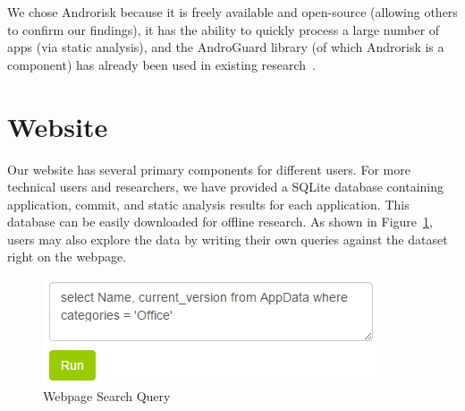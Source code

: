 \documentclass[journal,transmag]{IEEEtran}
\newcommand{\todo}[1]{\textcolor{cyan}{\textbf{[#1]}}}
\newcommand{\dan}[1]{\textcolor{blue}{{\it [Dan says: #1]}}}
\begin{document}
We chose Androrisk because it is freely available and open-source (allowing others to confirm our findings), it has the ability to quickly process a large number of apps (via static analysis), and the AndroGuard library (of which Androrisk is a component) has already been used in existing research~\cite{Egele:2013:ESC:2508859.2516693}.









\section{Website}
\label{sec: website}
%

Our website has several primary components for different users. For more technical users and researchers, we have provided a SQLite database containing application, commit, and static analysis results for each application. This database can be easily downloaded for offline research. As shown in Figure~\ref{fig:webpagequery}, users may also explore the data by writing their own queries against the dataset right on the webpage.

\begin{figure}[ht!]
\centering
\includegraphics[width=\columnwidth, angle = 0, scale=.8]{images/webpageQuery.png}
\caption{Webpage Search Query}
\label{fig:webpagequery}
\end{figure}
\end{document}

